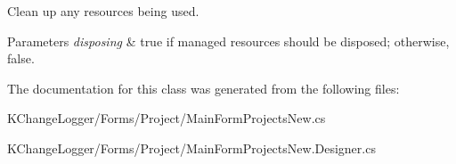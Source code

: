 Clean up any resources being used. 


\begin{DoxyParams}{Parameters}
{\em disposing} & true if managed resources should be disposed; otherwise, false.\\
\hline
\end{DoxyParams}


The documentation for this class was generated from the following files\-:\begin{DoxyCompactItemize}
\item 
K\-Change\-Logger/\-Forms/\-Project/Main\-Form\-Projects\-New.\-cs\item 
K\-Change\-Logger/\-Forms/\-Project/Main\-Form\-Projects\-New.\-Designer.\-cs\end{DoxyCompactItemize}
